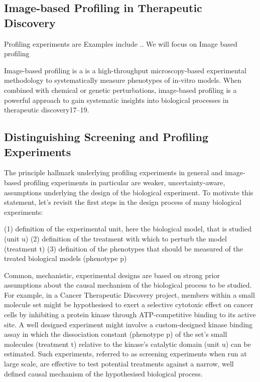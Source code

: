 \begin{flushleft}
\section{Image-based Profiling in Therapeutic Discovery} 

Profiling experiments are 
Examples include .. We will focus on Image based profiling

Image-based profiling is a is a high-throughput microscopy-based experimental methodology to systematically measure phenotypes of in-vitro models. When combined with chemical or genetic perturbations, image-based profiling is a powerful approach to gain systematic insights into biological processes in therapeutic discovery17–19. 

\subsection{Distinguishing Screening and Profiling Experiments}

The principle hallmark underlying profiling experiments in general and image-based profiling experiments in particular are weaker, uncertainty-aware, assumptions underlying the design of the biological experiment. To motivate this statement, let's revisit the first steps in the design process of many biological experiments: 

(1) definition of the experimental unit, here the biological model, that is studied (unit u)
(2) definition of the treatment with which to perturb the model (treatment t)
(3) definition of the phenotypes that should be measured of the treated biological models (phenotype p)

Common, mechanistic, experimental designs are based on strong prior assumptions about the causal mechanism of the biological process to be studied. For example, in a Cancer Therapeutic Discovery project, members within a small molecule set might be hypothesised to exert a selective cytotoxic effect on cancer cells by inhibiting a protein kinase through ATP-competitive binding to its active site. A well designed experiment might involve a custom-designed kinase binding assay in which the dissociation constant (phenotype p) of the set's small molecules (treatment t) relative to the kinase's catalytic domain (unit u) can be estimated. Such experiments, referred to as screening experiments when run at large scale, are effective to test potential treatments against a narrow, well defined causal mechanism of the hypothesised biological process. 


\end{flushleft}
